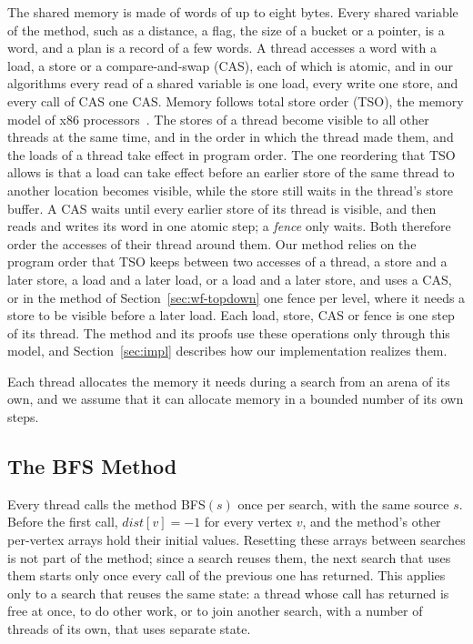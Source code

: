 The shared memory is made of words of up to eight bytes. Every shared variable of the method, such as a distance, a flag, the size of a bucket or a pointer, is a word, and a plan is a record of a few words. A thread accesses a word with a load, a store or a compare-and-swap (CAS), each of which is atomic, and in our algorithms every read of a shared variable is one load, every write one store, and every call of \textsc{CAS} one CAS. Memory follows total store order (TSO), the memory model of x86 processors~\cite{x86tso, intelmanual, amdmanual}. The stores of a thread become visible to all other threads at the same time, and in the order in which the thread made them, and the loads of a thread take effect in program order. The one reordering that TSO allows is that a load can take effect before an earlier store of the same thread to another location becomes visible, while the store still waits in the thread's store buffer. A CAS waits until every earlier store of its thread is visible, and then reads and writes its word in one atomic step; a \emph{fence} only waits. Both therefore order the accesses of their thread around them. Our method relies on the program order that TSO keeps between two accesses of a thread, a store and a later store, a load and a later load, or a load and a later store, and uses a CAS, or in the method of Section~\ref{sec:wf-topdown} one fence per level, where it needs a store to be visible before a later load. Each load, store, CAS or fence is one step of its thread. The method and its proofs use these operations only through this model, and Section~\ref{sec:impl} describes how our implementation realizes them.

Each thread allocates the memory it needs during a search from an arena of its own, and we assume that it can allocate memory in a bounded number of its own steps.

\subsection{The BFS Method}
\label{sec:bg-method}

Every thread calls the method \textsc{BFS}$(s)$ once per search, with the same source $s$. Before the first call, $\mathit{dist}[v] = -1$ for every vertex $v$, and the method's other per-vertex arrays hold their initial values. Resetting these arrays between searches is not part of the method; since a search reuses them, the next search that uses them starts only once every call of the previous one has returned. This applies only to a search that reuses the same state: a thread whose call has returned is free at once, to do other work, or to join another search, with a number of threads of its own, that uses separate state.

